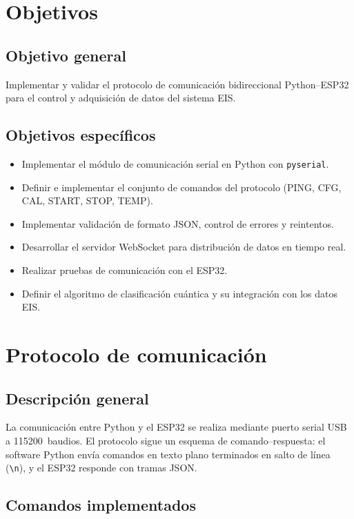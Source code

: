 \documentclass[11pt,a4paper,spanish]{book}
\begin{document}
\chapter{Objetivos}

\section{Objetivo general}
Implementar y validar el protocolo de comunicaci\'{o}n bidireccional Python--ESP32 para el control y adquisici\'{o}n de datos del sistema EIS.

\section{Objetivos espec\'{i}ficos}
\begin{itemize}
	\item Implementar el m\'{o}dulo de comunicaci\'{o}n serial en Python con \texttt{pyserial}.
	\item Definir e implementar el conjunto de comandos del protocolo (PING, CFG, CAL, START, STOP, TEMP).
	\item Implementar validaci\'{o}n de formato JSON, control de errores y reintentos.
	\item Desarrollar el servidor WebSocket para distribuci\'{o}n de datos en tiempo real.
	\item Realizar pruebas de comunicaci\'{o}n con el ESP32.
	\item Definir el algoritmo de clasificaci\'{o}n cu\'{a}ntica y su integraci\'{o}n con los datos EIS.
\end{itemize}


\chapter{Protocolo de comunicaci\'{o}n}

\section{Descripci\'{o}n general}

La comunicaci\'{o}n entre Python y el ESP32 se realiza mediante puerto serial USB a 115200~baudios. El protocolo sigue un esquema de comando--respuesta: el software Python env\'{i}a comandos en texto plano terminados en salto de l\'{i}nea (\texttt{\textbackslash n}), y el ESP32 responde con tramas JSON.

\section{Comandos implementados}
\end{document}
